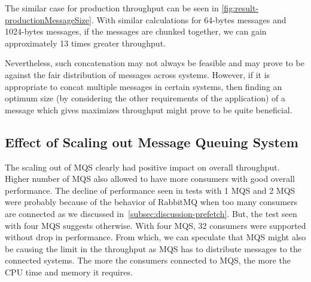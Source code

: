   The similar case for production throughput can be seen in \autoref{fig:result-productionMessageSize}. With similar calculations for 64-bytes messages and 1024-bytes messages, if the messages are chunked together, we can gain approximately 13 times greater throughput.

  Nevertheless, such concatenation may not always be feasible and may prove to be against the fair distribution of messages across systems. However, if it is appropriate to concat multiple messages in certain systems, then finding an optimum size (by considering the other requirements of the application) of a message which gives maximizes throughput might prove to be quite beneficial.

\subsection{Effect of Scaling out Message Queuing System}
  The scaling out of MQS clearly had positive impact on overall throughput. Higher number of MQS also allowed to have more consumers with good overall performance. The decline of performance seen in tests with 1 MQS and 2 MQS were probably because of the behavior of RabbitMQ when too many consumers are connected as we discussed in~\autoref{subsec:discussion-prefetch}. But, the test seen with four MQS suggests otherwise. With four MQS, 32 consumers were supported without drop in performance. From which, we can speculate that MQS might also be causing the limit in the throughput as MQS has to distribute messages to the connected systems. The more the consumers connected to MQS, the more the CPU time and memory it requires.

